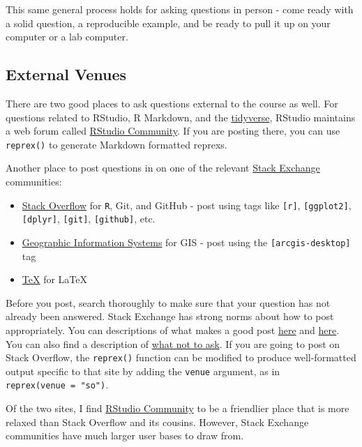 \documentclass[]{book}
\providecommand{\tightlist}{%
  \setlength{\itemsep}{0pt}\setlength{\parskip}{0pt}}
\theoremstyle{definition}
\theoremstyle{definition}
\theoremstyle{definition}
\theoremstyle{remark}
\begin{document}
This same general process holds for asking questions in person - come
ready with a solid question, a reproducible example, and be ready to
pull it up on your computer or a lab computer.

\subsection{External Venues}\label{external-venues}

There are two good places to ask questions external to the course as
well. For questions related to RStudio, R Markdown, and the
\href{http://tidyverse.org}{tidyverse}, RStudio maintains a web forum
called \href{https://community.rstudio.com}{RStudio Community}. If you
are posting there, you can use \texttt{reprex()} to generate Markdown
formatted reprexs.

Another place to post questions in on one of the relevant
\href{https://stackexchange.com}{Stack Exchange} communities:

\begin{itemize}
\tightlist
\item
  \href{https://stackoverflow.com}{Stack Overflow} for \texttt{R}, Git,
  and GitHub - post using tags like \texttt{{[}r{]}},
  \texttt{{[}ggplot2{]}}, \texttt{{[}dplyr{]}}, \texttt{{[}git{]}},
  \texttt{{[}github{]}}, etc.
\item
  \href{https://gis.stackexchange.com}{Geographic Information Systems}
  for GIS - post using the \texttt{{[}arcgis-desktop{]}} tag
\item
  \href{https://tex.stackexchange.com}{TeX} for LaTeX
\end{itemize}

Before you post, search thoroughly to make sure that your question has
not already been answered. Stack Exchange has strong norms about how to
post appropriately. You can descriptions of what makes a good post
\href{https://codereview.stackexchange.com/help/how-to-ask}{here} and
\href{https://stackoverflow.com/help/how-to-ask}{here}. You can also
find a description of
\href{https://stackoverflow.com/help/dont-ask}{what not to ask}. If you
are going to post on Stack Overflow, the \texttt{reprex()} function can
be modified to produce well-formatted output specific to that site by
adding the \texttt{venue} argument, as in
\texttt{reprex(venue\ =\ "so")}.

Of the two sites, I find \href{https://community.rstudio.com}{RStudio
Community} to be a friendlier place that is more relaxed than Stack
Overflow and its cousins. However, Stack Exchange communities have much
larger user bases to draw from.
\end{document}
